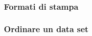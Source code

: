 \documentclass[aspectratio=169]{beamer}
\begin{document}
\begin{frame}[containsverbatim]\frametitle{Formati di stampa}
\end{frame}



\begin{frame}[containsverbatim]\frametitle{Ordinare un data set}
\end{frame}








\end{document}
